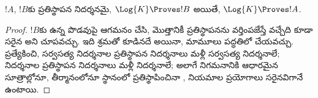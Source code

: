 \documentclass[../../../include/open-logic-section]{subfiles}
\begin{document}
\begin{prop}
  $!A$, $!B$కు ప్రతిస్థాపన నిదర్శనమై, $\Log{K} \Proves !B$ అయితే,
  $\Log{K} \Proves !A$.
\end{prop}

\begin{proof}
  $!B$కు ఉన్న  పొడవుపై
  ఆగమనం చేసి,  మొత్తానికీ
  ప్రతిస్థాపనను వర్తింపజేస్తే వచ్చేది కూడా సరైన
   అని చూపవచ్చు.
  ఇది శ్రమతో కూడినదే అయినా, మామూలు పద్ధతిలో చేయవచ్చు. ప్రత్యేకించి, సర్వసత్య నిదర్శనాల
  ప్రతిస్థాపన నిదర్శనాలు మళ్లీ సర్వసత్య నిదర్శనాలే;
   నిదర్శనాల
  ప్రతిస్థాపన నిదర్శనాలు మళ్లీ
   నిదర్శనాలే; అలాగే
  నిగమనానికి ఆధారమైన సూత్రాల్లోనూ, తీర్మానంలోనూ
  స్థానంలో  ప్రతిస్థాపించినా
   \MP{}, \Nec{} నియమాల ప్రయోగాలు సరైనవిగానే ఉంటాయి.
\end{proof}
\end{document}
